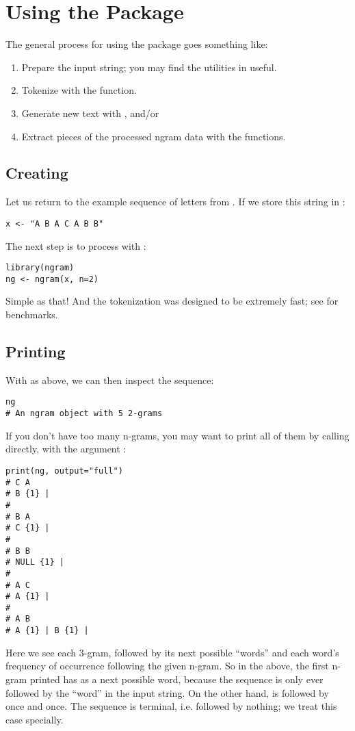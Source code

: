 \section{Using the Package}


The general process for using the  package goes something like:
\begin{enumerate}
  \item Prepare the input string; you may find the utilities in  useful.
  \item Tokenize with the  function.
  \item Generate new text with , and/or
  \item Extract pieces of the processed ngram data with the  functions.
\end{enumerate}



\subsection{Creating}

Let us return to the example sequence of letters from .  If 
we store this string in :
\begin{lstlisting}[language=rr]
x <- "A B A C A B B"
\end{lstlisting}
The next step is to process with :
\begin{lstlisting}[language=rr]
library(ngram)
ng <- ngram(x, n=2)
\end{lstlisting}
Simple as that!  And the tokenization was designed to be extremely fast; see 
 for benchmarks.



\subsection{Printing}

With  as above, we can then inspect the sequence:
\begin{lstlisting}[language=rr]
ng
# An ngram object with 5 2-grams
\end{lstlisting}
If you don't have too many n-grams, you may want to print all of them by 
calling 
 directly, with the  argument :
\begin{lstlisting}[language=rr]
print(ng, output="full")
# C A 
# B {1} | 
# 
# B A 
# C {1} | 
# 
# B B 
# NULL {1} | 
# 
# A C 
# A {1} | 
# 
# A B 
# A {1} | B {1} | 
\end{lstlisting}
Here we see each 3-gram, followed by its next possible ``words'' and each 
word's frequency of occurrence following the given n-gram.  So in 
the above, the first n-gram printed  has  as a next 
possible word, because the sequence  is only ever followed by the 
``word''  in the input string.  On the other hand,  is 
followed by  once and  once.  The sequence  is 
terminal, i.e. followed by nothing; we treat this case specially.


